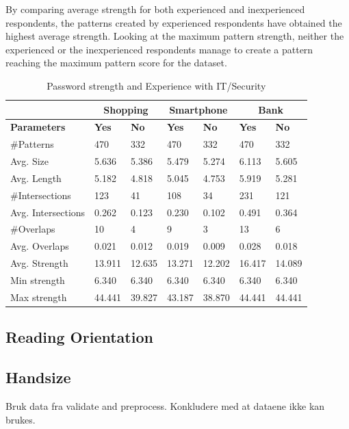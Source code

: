     By comparing average strength for both experienced and inexperienced respondents, the patterns created by experienced respondents have obtained the highest average strength. Looking at the maximum pattern strength, neither the experienced or the inexperienced respondents manage to create a pattern reaching the maximum pattern score for the dataset.

      \begin{table}[H]
        \centering
        \begin{tabular}{l || l | l || l | l || l | l }
          \hline
           & \multicolumn{2}{c||}{\bf Shopping} & \multicolumn{2}{c||}{\bf Smartphone} &\multicolumn{2}{c}{\bf Bank} \\ \hline
          {\bf Parameters}   & {\bf Yes} & {\bf No} & {\bf Yes} & {\bf No} & {\bf Yes} & {\bf No}\\ \hline
          \#Patterns         & 470    & 332    & 470    & 332    & 470    & 332    \\
          Avg. Size          & 5.636  & 5.386  & 5.479  & 5.274  & 6.113  & 5.605  \\
          Avg. Length        & 5.182  & 4.818  & 5.045  & 4.753  & 5.919  & 5.281  \\
          \#Intersections    & 123    & 41     & 108    & 34     & 231    & 121    \\
          Avg. Intersections & 0.262  & 0.123  & 0.230  & 0.102  & 0.491  & 0.364  \\
          \#Overlaps         & 10     & 4      & 9      & 3      & 13     & 6      \\
          Avg. Overlaps      & 0.021  & 0.012  & 0.019  & 0.009  & 0.028  & 0.018  \\ \hline
          Avg. Strength      & 13.911 & 12.635 & 13.271 & 12.202 & 16.417 & 14.089 \\ 
          Min strength       & 6.340  & 6.340  & 6.340  & 6.340  & 6.340  & 6.340  \\
          Max strength       & 44.441 & 39.827 & 43.187 & 38.870 & 44.441 & 44.441 \\ \hline
        \end{tabular}
        \caption{Password strength and Experience with IT/Security}
        \label{tab:experiencestrength} 
      \end{table}

  \subsection{Reading Orientation}

  \subsection{Handsize}

    Bruk data fra validate and preprocess. Konkludere med at dataene ikke kan brukes.




